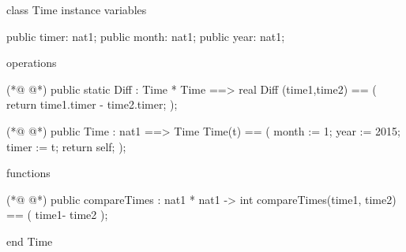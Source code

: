\begin{vdmpp}[breaklines=true]
class Time
instance variables

public timer: nat1;
public month: nat1;
public year: nat1;

operations

(*@
\label{Diff:10}
@*)
public static Diff : Time * Time ==> real 
Diff (time1,time2) == (
  return time1.timer - time2.timer;
);

(*@
\label{Time:15}
@*)
public Time : nat1 ==> Time
  Time(t) == (
   month := 1;
   year := 2015;
   timer := t;
  return self;
 );
 
functions

(*@
\label{compareTimes:25}
@*)
 public compareTimes : nat1 * nat1 -> int
  compareTimes(time1, time2) == (
  time1- time2
 );
 
end Time
\end{vdmpp}
